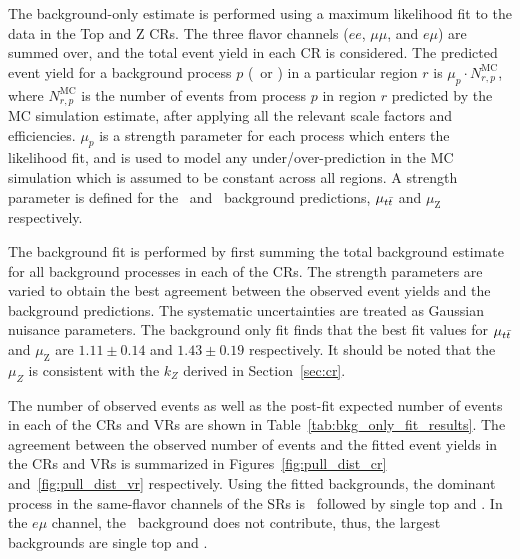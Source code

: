 The background-only estimate is performed using a maximum likelihood fit
to the data in the Top and Z CRs.
The three flavor channels ($ee$, $\mu\mu$, and $e\mu$) are summed over, and the
total event yield in each CR is considered.
The predicted event yield for a background process $p$ (\TTBAR\ or \ZGAMMAJETS)
in a particular region $r$ is $\mu_{p} \cdot N_{r,p}^\mathrm{MC}$, where
$N_{r,p}^\mathrm{MC}$ is the number of events from process $p$ in region $r$
predicted by the MC simulation estimate, after applying all the relevant
scale factors and efficiencies.
$\mu_{p}$ is a strength parameter for each process which enters the likelihood
fit, and is used to model any under/over-prediction in the MC simulation
which is assumed to be constant across all regions.
A strength parameter is defined for the \TTBAR\ and \ZGAMMAJETS\ background
predictions, $\mu_{t\bar{t}}$ and $\mu_\mathrm{Z}$ respectively.

The background fit is performed by first summing the total background estimate
for all background processes in each of the CRs.
The strength parameters are varied to obtain the best agreement between
the observed event yields and the background predictions.
The systematic uncertainties are treated as Gaussian nuisance parameters.
The background only fit finds that the best fit values for $\mu_{t\bar{t}}$ and
$\mu_\mathrm{Z}$ are $1.11 \pm 0.14$ and $1.43 \pm 0.19$ respectively.
It should be noted that the $\mu_Z$ is consistent with the $k_Z$
derived in Section~\ref{sec:cr}.

The number of observed events as well as the post-fit expected number
of events in each of the CRs and VRs are shown in
Table~\ref{tab:bkg_only_fit_results}.
The agreement between the observed number of events and the fitted event
yields in the CRs and VRs is summarized in
Figures~\ref{fig:pull_dist_cr} and~\ref{fig:pull_dist_vr} respectively.
Using the fitted backgrounds, the dominant process in the same-flavor
channels of the SRs is \ZGAMMAJETS\ followed by single top and
\TTBAR. In the $e\mu$ channel, the \ZGAMMAJETS\ background does
not contribute, thus, the largest backgrounds are single top and \TTBAR.

